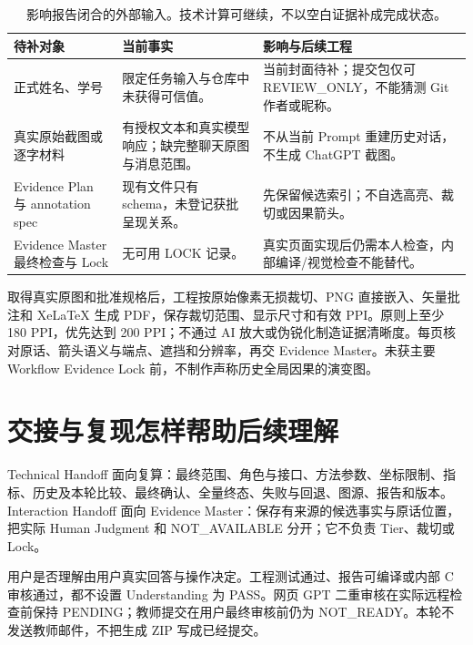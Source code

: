 \documentclass[11pt,a4paper]{article}
\begin{document}
\begin{table}[H]\centering\small\caption{影响报告闭合的外部输入。技术计算可继续，不以空白证据补成完成状态。}\begin{tabularx}{\linewidth}{@{}p{31mm}Y Y@{}}\toprule 待补对象 & 当前事实 & 影响与后续工程 \\ \midrule
正式姓名、学号 & 限定任务输入与仓库中未获得可信值。 & 当前封面待补；提交包仅可 REVIEW\_ONLY，不能猜测 Git 作者或昵称。 \\
真实原始截图或逐字材料 & 有授权文本和真实模型响应；缺完整聊天原图与消息范围。 & 不从当前 Prompt 重建历史对话，不生成 ChatGPT 截图。 \\
Evidence Plan 与 annotation spec & 现有文件只有 schema，未登记获批呈现关系。 & 先保留候选索引；不自选高亮、裁切或因果箭头。 \\
Evidence Master 最终检查与 Lock & 无可用 LOCK 记录。 & 真实页面实现后仍需本人检查，内部编译/视觉检查不能替代。 \\
\bottomrule\end{tabularx}\end{table}

取得真实原图和批准规格后，工程按原始像素无损裁切、PNG 直接嵌入、矢量批注和 XeLaTeX 生成 PDF，保存裁切范围、显示尺寸和有效 PPI。原则上至少 180 PPI，优先达到 200 PPI；不通过 AI 放大或伪锐化制造证据清晰度。每页核对原话、箭头语义与端点、遮挡和分辨率，再交 Evidence Master。未获主要 Workflow Evidence Lock 前，不制作声称历史全局因果的演变图。

\section{交接与复现怎样帮助后续理解}
Technical Handoff 面向复算：最终范围、角色与接口、方法参数、坐标限制、指标、历史及本轮比较、最终确认、全量终态、失败与回退、图源、报告和版本。Interaction Handoff 面向 Evidence Master：保存有来源的候选事实与原话位置，把实际 Human Judgment 和 NOT\_AVAILABLE 分开；它不负责 Tier、裁切或 Lock。

用户是否理解由用户真实回答与操作决定。工程测试通过、报告可编译或内部 C 审核通过，都不设置 Understanding 为 PASS。网页 GPT 二重审核在实际远程检查前保持 PENDING；教师提交在用户最终审核前仍为 NOT\_READY。本轮不发送教师邮件，不把生成 ZIP 写成已经提交。

\appendix
\end{document}
